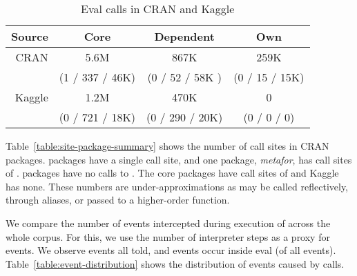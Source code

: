 \documentclass[USenglish,cleveref, autoref, thm-restate]{lipics-v2019}
\begin{document}
\begin{table}[!h] \centering
 \begin{tabular}{r|c|c|c} \hline
Source & Core    & Dependent                      & Own \\\hline
CRAN   & 5.6M &  867K    & 259K \\
       & (1 / 337 / 46K)& (0 / 52 / 58K ) & (0 / 15 / 15K) \\\hline
Kaggle &  1.2M &  470K   & 0\\
 &  (0 / 721 / 18K) & (0 / 290 / 20K) & (0 / 0 / 0)\\\hline
\end{tabular}\caption{Eval calls in CRAN and Kaggle}\label{A}\end{table}


Table~\ref{table:site-package-summary} shows the number of call sites in
CRAN packages. \OneCallSitesEnrich{} packages have a single call site, and one
package, \emph{metafor}, has \MaxCallSitesEnrich{} call sites of
\eval. \NoCallSitesEnrich{} packages have no calls to \eval. The core packages
have \NbCoreEvalCallSites{} call sites of \eval and Kaggle has none. These
numbers are under-approximations as \eval may be called reflectively,
through aliases, or passed to a higher-order function.


\begin{table}[ht]
\caption{Distribution of callsites in CRAN}
\label{table:site-package-summary}
\end{table}

We compare the number of events intercepted during execution of \eval across
the whole corpus. For this, we use the number of interpreter steps as a
proxy for events. We observe \AllEventCountRnd events all told, and
\EvalEventCountRnd events occur inside eval (\EvalEventAllPerc of all
events). Table~\ref{table:event-distribution} shows the distribution of
events caused by \eval calls.

\begin{table}[ht] \label{table:event-distribution}
  \caption{Events in \eval calls}
\end{table}
\end{document}
